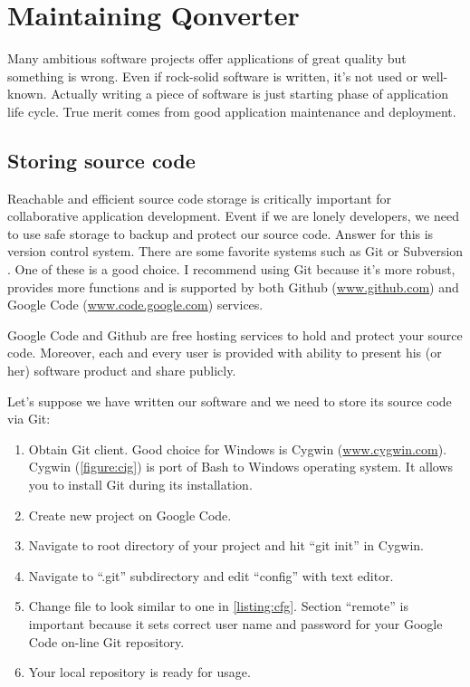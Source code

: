 \chapter{Maintaining Qonverter}
Many ambitious software projects offer applications of great quality but something is wrong. Even if rock-solid software is written, it's not used or well-known. Actually writing a piece of software is just starting phase of application life cycle. True merit comes from good application maintenance and deployment.

\section{Storing source code}
Reachable and efficient source code storage is critically important for collaborative application development. Event if we are lonely developers, we need to use safe storage to backup and protect our source code. Answer for this is version control system. There are some favorite systems such as Git \citep{various:git} or Subversion \citep{various:svn}. One of these is a good choice. I recommend using Git because it's more robust, provides more functions and is supported by both Github (\href{http://www.github.com}{www.github.com}) and Google Code (\href{http://www.code.google.com}{www.code.google.com}) services.

Google Code and Github are free hosting services to hold and protect your source code. Moreover, each and every user is provided with ability to present his (or her) software product and share publicly.

Let's suppose we have written our software and we need to store its source code via Git:
\begin{enumerate}
\item Obtain Git client. Good choice for Windows is Cygwin (\href{http://www.cygwin.com}{www.cygwin.com}). Cygwin (\autoref{figure:cig}) is port of Bash to Windows operating system. It allows you to install Git during its installation.
\item Create new project on Google Code.
\item Navigate to root directory of your project and hit \enquote{git init} in Cygwin.
\item Navigate to \enquote{.git} subdirectory and edit \enquote{config} with text editor.
\item Change file to look similar to one in \autoref{listing:cfg}. Section \enquote{remote} is important because it sets correct user name and password for your Google Code on-line Git repository.
\item Your local repository is ready for usage.
\end{enumerate}

